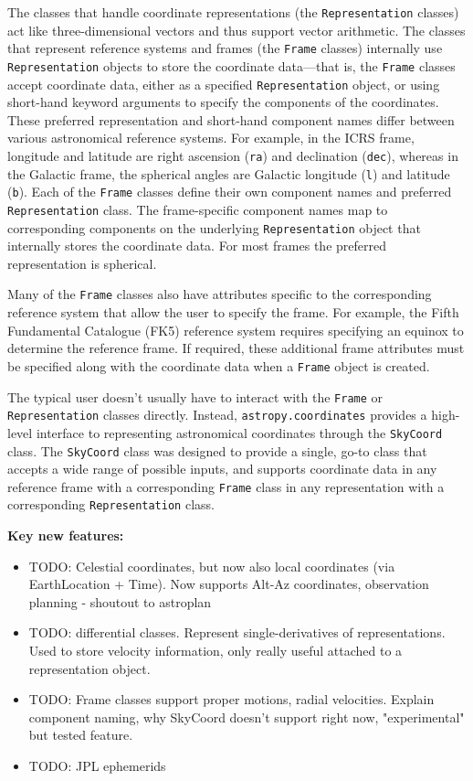 \documentclass[modern]{aastex61}
\begin{document}
The classes that handle coordinate representations (the \texttt{Representation}
classes) act like three-dimensional vectors and thus support vector arithmetic.
The classes that represent reference systems and frames (the \texttt{Frame}
classes) internally use \texttt{Representation} objects to store the coordinate
data---that is, the \texttt{Frame} classes accept coordinate data, either as a
specified \texttt{Representation} object, or using short-hand keyword arguments
to specify the components of the coordinates.
These preferred representation and short-hand component names differ between
various astronomical reference systems.
For example, in the ICRS frame, longitude and latitude are right ascension
(\texttt{ra}) and declination (\texttt{dec}), whereas in the Galactic frame, the
spherical angles are Galactic longitude (\texttt{l}) and latitude (\texttt{b}).
Each of the \texttt{Frame} classes define their own component names and
preferred \texttt{Representation} class.
The frame-specific component names map to corresponding components on the
underlying \texttt{Representation} object that internally stores the coordinate
data.
For most frames the preferred representation is spherical.

Many of the \texttt{Frame} classes also have attributes specific to the
corresponding reference system that allow the user to specify the frame.
For example, the Fifth Fundamental Catalogue (FK5) reference system requires
specifying an equinox to determine the reference frame.
If required, these additional frame attributes must be specified along with the
coordinate data when a \texttt{Frame} object is created.

The typical user doesn't usually have to interact with the \texttt{Frame} or
\texttt{Representation} classes directly.
Instead, \texttt{astropy.coordinates} provides a high-level interface to
representing astronomical coordinates through the \texttt{SkyCoord} class.
The \texttt{SkyCoord} class was designed to provide a single, go-to class that
accepts a wide range of possible inputs, and supports coordinate data in any
reference frame with a corresponding \texttt{Frame} class in any representation
with a corresponding \texttt{Representation} class.

\textbf{Key new features:}
\begin{itemize}
    \item TODO: Celestial coordinates, but now also local coordinates (via
    EarthLocation + Time). Now supports Alt-Az coordinates, observation planning
    - shoutout to astroplan
    \item TODO: differential classes. Represent single-derivatives of
    representations. Used to store velocity information, only really useful
    attached to a representation object.
    \item TODO: Frame classes support proper motions, radial velocities. Explain
    component naming, why SkyCoord doesn't support right now, "experimental" but
    tested feature.
    \item TODO: JPL ephemerids %
\end{itemize}
\end{document}
